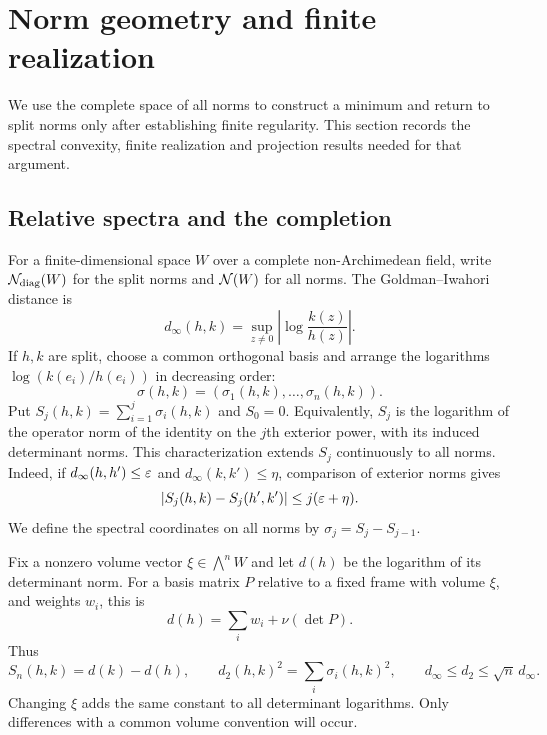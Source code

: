 \section{Norm geometry and finite realization}\label{sec:normgeometry}

We use the complete space of all norms to construct a minimum and return
to split norms only after establishing finite regularity. This section
records the spectral convexity, finite realization and projection results
needed for that argument.

\subsection{Relative spectra and the completion}
For a finite-dimensional space $W$ over a complete non-Archimedean field,
write $\mathcal N_{\mathrm{diag}}(W)$ for the split norms and $\mathcal N(W)$ for all norms.
The Goldman--Iwahori distance is
\[
 d_\infty(h,k)=\sup_{z\ne0}\left|\log\frac{k(z)}{h(z)}\right|.
\]
If $h,k$ are split, choose a common orthogonal basis and arrange the
logarithms $\log(k(e_i)/h(e_i))$ in decreasing order:
\[
 \sigma(h,k)=(\sigma_1(h,k),\ldots,\sigma_n(h,k)).
\]
Put $S_j(h,k)=\sum_{i=1}^j\sigma_i(h,k)$ and $S_0=0$.
Equivalently, $S_j$ is the logarithm of the operator norm of the identity
on the $j$th exterior power, with its induced determinant norms.
This characterization extends $S_j$ continuously to all norms. Indeed,
if $d_\infty(h,h')\le\varepsilon$ and $d_\infty(k,k')\le\eta$, comparison of
exterior norms gives
\begin{equation}\label{eq:spectralcontinuity}
 |S_j(h,k)-S_j(h',k')|\le j(\varepsilon+\eta).
\end{equation}
We define the spectral coordinates on all norms by $\sigma_j=S_j-S_{j-1}$.

Fix a nonzero volume vector $\xi\in\bigwedge^nW$ and let $d(h)$ be the
logarithm of its determinant norm. For a basis matrix $P$ relative to a
fixed frame with volume $\xi$, and weights $w_i$, this is
\begin{equation}\label{eq:detnorm}
 d(h)=\sum_iw_i+\nu(\det P).
\end{equation}
Thus
\begin{equation}\label{eq:detspectrum}
 S_n(h,k)=d(k)-d(h),\qquad
 d_2(h,k)^2=\sum_i\sigma_i(h,k)^2,
 \qquad d_\infty\le d_2\le\sqrt n\,d_\infty.
\end{equation}
Changing $\xi$ adds the same constant to all determinant logarithms.
Only differences with a common volume convention will occur.

